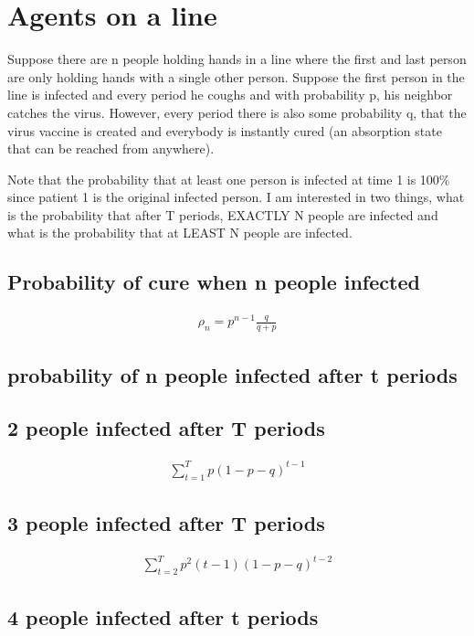 \documentclass[12pt]{report}
\numberwithin{equation}{section}
\begin{document}
\section{Agents on a line}

Suppose there are n people holding hands in a line where the first and last person are only holding hands with a single other person. Suppose the first person in the line is infected and every period he coughs and with probability p, his neighbor catches the virus. However, every period there is also some probability q, that the virus vaccine is created and everybody is instantly cured (an absorption state that can be reached from anywhere).

Note that the probability that at least one person is infected at time 1 is 100\% since patient 1 is the original infected person. I am interested in two things, what is the probability that after T periods, EXACTLY N people are infected and what is the probability that at LEAST N people are infected.


\subsection{Probability of cure when n people infected}

\begin{align}
\rho_n = p^{n-1}\frac{q}{q+p}
\end{align}

\subsection{probability of n people infected after t periods}

\subsection{2 people infected after T periods}

\begin{align}
 \sum_{t=1}^{T}p(1-p-q)^{t-1}
\end{align}

\subsection{3 people infected after T periods}
\begin{align}
\sum_{t=2}^{T}p^2(t-1)(1-p-q)^{t-2}
\end{align}

\subsection{4 people infected after t periods}
\end{document}
